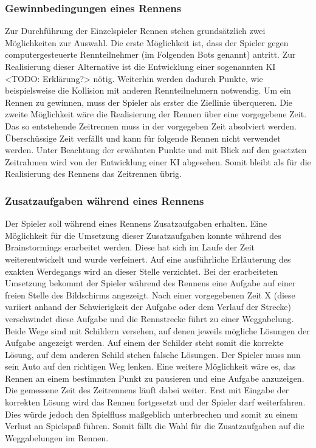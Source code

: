 	\subsubsection{Gewinnbedingungen eines Rennens}
	Zur Durchführung der Einzelspieler Rennen stehen grundsätzlich zwei Möglichkeiten zur Auswahl. Die erste Möglichkeit ist, dass der Spieler gegen computergesteuerte Rennteilnehmer (im Folgenden Bots genannt) antritt. Zur Realisierung dieser Alternative ist die Entwicklung einer sogenannten KI <TODO: Erklärung?> nötig. Weiterhin werden dadurch Punkte, wie beispielsweise die Kollision mit anderen Rennteilnehmern notwendig. Um ein Rennen zu gewinnen, muss der Spieler als erster die Ziellinie überqueren.
	Die zweite Möglichkeit wäre die Realisierung der Rennen über eine vorgegebene Zeit. Das so entstehende Zeitrennen muss in der vorgegeben Zeit absolviert werden. Überschüssige Zeit verfällt und kann für folgende Rennen nicht verwendet werden.
	Unter Beachtung der erwähnten Punkte und mit Blick auf den gesetzten Zeitrahmen wird von der Entwicklung einer KI abgesehen. Somit bleibt als für die Realisierung des Rennens das Zeitrennen übrig.

	\subsubsection{Zusatzaufgaben während eines Rennens}
	Der Spieler soll während eines Rennens Zusatzaufgaben erhalten. Eine Möglichkeit für die Umsetzung dieser Zusatzaufgaben konnte während des Brainstormings erarbeitet werden. Diese hat sich im Laufe der Zeit weiterentwickelt und wurde verfeinert. Auf eine ausführliche Erläuterung des exakten Werdegangs wird an dieser Stelle verzichtet.
	Bei der erarbeiteten Umsetzung bekommt der Spieler während des Rennens eine Aufgabe auf einer freien Stelle des Bildschirms angezeigt. Nach einer vorgegebenen Zeit X (diese variiert anhand der Schwierigkeit der Aufgabe oder dem Verlauf der Strecke) verschwindet diese Aufgabe und die Rennstrecke führt zu einer Weggabelung. Beide Wege sind mit Schildern versehen, auf denen jeweils mögliche Lösungen der Aufgabe angezeigt werden. Auf einem der Schilder steht somit die korrekte Lösung, auf dem anderen Schild stehen falsche Lösungen. Der Spieler muss nun sein Auto auf den richtigen Weg lenken.
	Eine weitere Möglichkeit wäre es, das Rennen an einem bestimmten Punkt zu pausieren und eine Aufgabe anzuzeigen. Die gemessene Zeit des Zeitrennens läuft dabei weiter. Erst mit Eingabe der korrekten Lösung wird das Rennen fortgesetzt und der Spieler darf weiterfahren. Dies würde jedoch den Spielfluss maßgeblich unterbrechen und somit zu einem Verlust an Spielspaß führen. Somit fällt die Wahl für die Zusatzaufgaben auf die Weggabelungen im Rennen.

